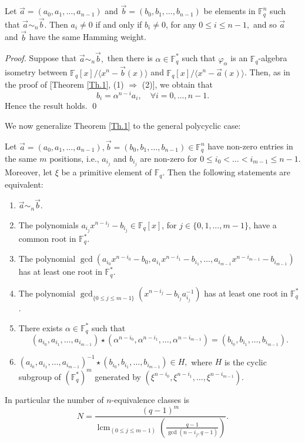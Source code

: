 \documentclass[12pt]{elsarticle}
\newcommand{\Fq}{\mathbb{F}_{q}}
\DeclareMathOperator{\lcm}{lcm}
\theoremstyle{break}
{\theorembodyfont{\upshape}
    \newtheorem{theorem}{Theorem}[section] %
    \newtheorem{lemma}[theorem]{Lemma} %
    \newtheorem{proposition}[theorem]{Proposition}
    \newtheorem{corollary}[theorem]{Corollary}
    \newtheorem{definition}[theorem]{Definition}
    \newtheorem{example}[theorem]{Example}
    \newtheorem{remark}[theorem]{Remark}
    \newtheorem{conjecture}[theorem]{Conjecture}
    \newtheorem*{proof}{{Proof}}
	\newtheorem*{notation}{Notation}
	\newtheorem*{main}{Cain Theorem}
	\newtheorem*{problem}{Problem}
}
\begin{document}
 \begin{lemma}
    Let $ \vec{a} = (a_0, a_1, \ldots, a_{n-1}) $ and $ \vec{b} = (b_0, b_1, \ldots, b_{n-1}) $ be elements in $\mathbb{F}_q^n $ such that  $ \vec{a} \sim_n\vec{b} $. Then $ a_i \neq 0 $ if and only if $ b_i \neq 0 $, for any $ 0\leq  i\leq n-1,$  and so $\vec{a}$ and $\vec{b}$ have the same Hamming weight.
 \end{lemma}
\begin{proof}
Suppose that $ \vec{a} \sim_n \vec{b},$ then there is $\alpha \in \Fq^*$ such that $ \varphi_{\alpha}$ is an $\Fq$-algebra isometry between $ \mathbb{F}_q[x] /\langle x^n-\vec{b}(x) \rangle $  and $ \mathbb{F}_q[x] /\langle x^n-\vec{a}(x) \rangle$. Then, as in the proof of [Theorem \ref{Th.1}, (1) $\Rightarrow$ (2)], we obtain that 
$$ b_i = \alpha^{n-i} a_i, \quad \forall i=0, \ldots, n-1.$$
Hence the result holds.
    \qed
\end{proof}

We now generalize Theorem \ref{Th.1} to the general polycyclic case: 

\begin{theorem}\label{Th_general}
Let $ \vec{a}=(a_0,a_1,\ldots, a_{n-1}), \vec{b}=(b_0,b_1,\ldots, b_{n-1})\in \mathbb{F}_q^{n}$ have non-zero entries in the same $m$ positions, i.e., $a_{i_j}$ and $b_{i_j}$ are non-zero  for $0\leq i_0<\dots<i_{m-1}\leq n-1$. Moreover, let $\xi $ be a primitive element of $\Fq$. Then the following statements are equivalent:
\begin{enumerate}
\item $ \vec{a} \sim_{n} \vec{b}$. 

\item The polynomials $ a_{i_j} x^{n-i_j} - b_{i_j} \in \mathbb{F}_q[x]$, for $ j \in \{0,1,\ldots,m-1\}$, have a common root in $\mathbb{F}_q^*$.

\item The polynomial $ \gcd( a_{i_0} x^{n-i_0} - b_0, a_{i_1} x^{n-i_1} - b_{i_1}, \ldots, a_{i_{m-1}} x^{n-i_{m-1}} - b_{i_{m-1}})$ has at least one root in $\mathbb{F}_q^*$.

\item The polynomial $ \gcd_{\{0 \leq j \leq m-1\}}( x^{n-{i_j}} - b_{i_j} a_{i_j}^{-1}) $ has at least one root in $\mathbb{F}_q^*$.
 \item  There exists $\alpha\in \Fq^*$ such that $$ (a_{i_0}, a_{i_1},\ldots, a_{i_{m-1}})\star(\alpha^{n-{i_0}}, \alpha^{n-{i_1}} , \ldots, \alpha^{n-{i_{m-1}}})=  ( b_{i_0}, b_{i_1},\ldots, b_{i_{m-1}}).$$
\item $ (a_{i_0}, a_{i_1},\ldots, a_{i_{m-1}})^{-1}\star( b_{i_0}, b_{i_1},\ldots, b_{i_{m-1}}) \in H,$ where $H$ is the cyclic subgroup of $ (\Fq^*)^m$ generated by 
$( \xi^{n-{i_0}},\xi^{n-{i_1}},\ldots, \xi^{n-{i_{m-1}}} ).$
\end{enumerate}
In particular the number of $n$-equivalence classes is
$$ N=\dfrac{ (q-1)^m}{ \lcm_{ (0 \leq j\leq m-1)}\left(\frac{q-1}{ \gcd(n-i_j,q-1)}\right)}. $$ 
\end{theorem}
\end{document}
